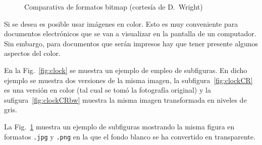 \documentclass[11pt,a4paper]{article}
\begin{document}
\begin{figure}[htb]
  \centering
	\caption[Comparación jpg y png con transparencia]{Comparativa de formatos bitmap (cortesía de D.~Wright)}
	\label{fig:lion}
\end{figure}

Si se desea es posible usar imágenes en color. Esto es muy conveniente para documentos electrónicos que se van a visualizar en la pantalla de un computador. Sin embargo, para documentos que serán impresos hay que tener presente algunos aspectos del color. 

En la Fig.~\ref{fig:clock} se muestra un ejemplo de empleo de subfiguras. En dicho ejemplo se muestra dos versiones de la misma imagen, la subfigura~\ref{fig:clockCR} es una versión en color (tal cual se tomó la fotografía original) y la sufigura~\ref{fig:clockCRbw} muestra la misma imagen transformada en niveles de gris.

La Fig.~\ref{fig:lion} muestra un ejemplo de subfiguras mostrando la misma figura en formatos \texttt{.jpg} y \texttt{.png} en la que el fondo blanco se ha convertido en transparente. 
\end{document}
